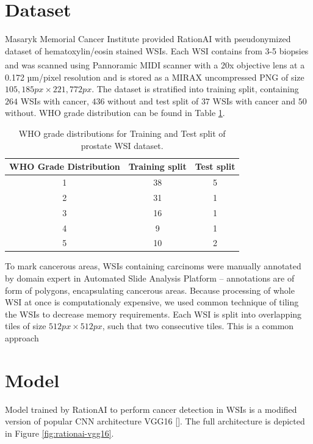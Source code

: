\section{Dataset}

Masaryk Memorial Cancer Institute provided RationAI with pseudonymized dataset of hematoxylin/eosin stained WSIs. Each WSI contains from 3-5 biopsies and was scanned using Pannoramic\textsuperscript{\textregistered} MIDI scanner with a 20x objective lens at a 0.172 µm/pixel resolution and is stored as a MIRAX uncompressed PNG of size $105,185 px \times 221,772 px$. The dataset is stratified into training split, containing $264$ WSIs with cancer, $436$ without and test split of $37$ WSIs with cancer and $50$ without. WHO grade distribution can be found in Table \ref{tab:who_grade_distribution}.

\begin{table}[h!]
\centering
\begin{tabular}{@{}ccc@{}}
\toprule
WHO Grade Distribution & Training split & Test split \\ 
\midrule
1         & 38             & 5              \\
2         & 31             & 1              \\
3         & 16             & 1              \\
4         & 9              & 1              \\
5         & 10             & 2              \\
\bottomrule
\end{tabular}
\caption{WHO grade distributions for Training and Test split of prostate WSI dataset.}
\label{tab:who_grade_distribution}
\end{table}

To mark cancerous areas, WSIs containing carcinoms were manually annotated by domain expert in Automated Slide Analysis Platform -- annotations are of form of polygons, encapsulating cancerous areas. Because processing of whole WSI at once is computationaly expensive, we used common technique of tiling the WSIs to decrease memory requirements. Each WSI is split into overlapping tiles of size $512px \times 512px$, such that two consecutive tiles. This is a common approach 

\section{Model}

Model trained by RationAI to perform cancer detection in WSIs is a modified version of popular CNN architecture VGG16 []. The full architecture is depicted in Figure \ref{fig:rationai-vgg16}.

